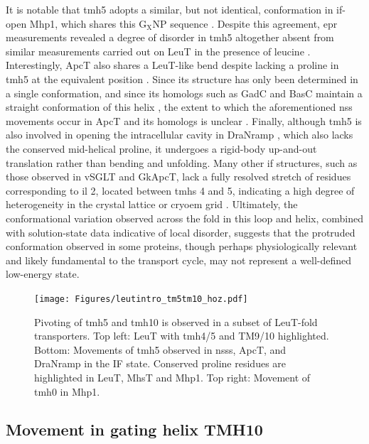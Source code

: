 It is notable that \gls{tmh}5 adopts a similar, but not identical, conformation in \gls{if}-open Mhp1, which shares this $\mathrm{G_{X}NP}$ sequence \citep*{Shimamura2010}. Despite this agreement, \gls{epr} measurements revealed a degree of disorder in \gls{tmh}5 altogether absent from similar measurements carried out on LeuT in the presence of leucine \citep*{Kazmier2014a}. Interestingly, ApcT also shares a LeuT-like bend despite lacking a proline in \gls{tmh}5 at the equivalent position \citep*{Shaffer2009}. Since its structure has only been determined in a single conformation, and since its homologs such as GadC and BasC maintain a straight conformation of this helix \citep*{Jungnickel2018, Ma2012}, the extent to which the aforementioned \gls{nss} movements occur in ApcT and its homologs is unclear \citep*{Shi2010}. Finally, although \gls{tmh}5 is also involved in opening the intracellular cavity in DraNramp \citep*{Bozzi2019}, which also lacks the conserved mid-helical proline, it undergoes a rigid-body up-and-out translation rather than bending and unfolding. Many other \gls{if} structures, such as those observed in vSGLT and GkApcT, lack a fully resolved stretch of residues corresponding to \gls{il} 2, located between \gls{tmh}s 4 and 5, indicating a high degree of heterogeneity in the crystal lattice or \gls{cryoem} grid \citep*{Jungnickel2018, Watanabe2010}. Ultimately, the conformational variation observed across the fold in this loop and helix, combined with solution-state data indicative of local disorder, suggests that the protruded conformation observed in some proteins, though perhaps physiologically relevant and likely fundamental to the transport cycle, may not represent a well-defined low-energy state.

\begin{figure}[h]
\centering
\texttt{[image: Figures/leutintro\_tm5tm10\_hoz.pdf]}
 \caption[Pivoting of TMH5 and TMH10 is observed in a subset of LeuT-fold transporters.]{Pivoting of \gls{tmh}5 and \gls{tmh}10 is observed in a subset of LeuT-fold transporters. Top left: LeuT with \gls{tmh}4/5 and TM9/10 highlighted. Bottom: Movements of \gls{tmh}5 observed in \gls{nss}s, ApcT, and DraNramp in the IF state. Conserved proline residues are highlighted in LeuT, MhsT and Mhp1. Top right: Movement of \gls{tmh}0 in Mhp1.}
\label{fig:leutintro_tm5tm10}
\end{figure}

\subsection{Movement in gating helix TMH10}

